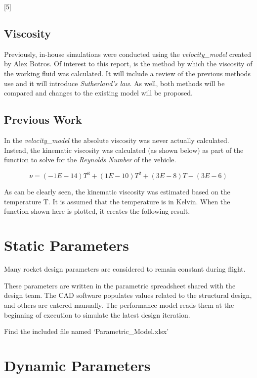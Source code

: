 \documentclass[]{book}
\begin{document}
{[}5{]}

\subsection{Viscosity}\label{viscosity}

Previously, in-house simulations were conducted using the
\emph{velocity\_model} created by Alex Botros. Of interest to this
report, is the method by which the viscosity of the working fluid was
calculated. It will include a review of the previous methods use and it
will introduce \emph{Sutherland's law}. As well, both methods will be
compared and changes to the existing model will be proposed.

\subsection{Previous Work}\label{previous-work}

In the \emph{velocity\_model} the absolute viscosity was never actually
calculated. Instead, the kinematic viscosity was calculated (as shown
below) as part of the function to solve for the \emph{Reynolds Number}
of the vehicle.

\begin{equation}
\label{kinematic_viscosity_f_T}
\nu = (-1 E -14) T^3 + (1 E -10) T^2 + (3 E -8) T - (3 E -6)
\end{equation}

As can be clearly seen, the kinematic viscosity was estimated based on
the temperature T. It is assumed that the temperature is in Kelvin. When
the function shown here is plotted, it creates the following result.

\section{Static Parameters}\label{static-parameters}

Many rocket design parameters are considered to remain constant during
flight.

These parameters are written in the parametric spreadsheet shared with
the design team. The CAD software populates values related to the
structural design, and others are entered manually. The performance
model reads them at the beginning of execution to simulate the latest
design iteration.

Find the included file named `Parametric\_Model.xlsx'

\section{Dynamic Parameters}\label{dynamic-parameters}
\end{document}
